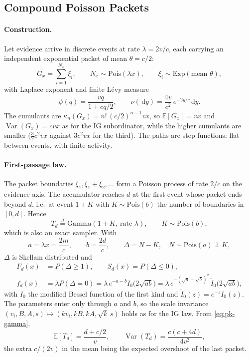\documentclass[12pt]{article}
\newcommand{\dd}{\,\mathrm{d}}
\begin{document}
\subsection{Compound Poisson Packets}
\label{sec:igs-packets}
\paragraph{Construction.}
Let evidence arrive in discrete events at rate $\lambda=2v/c$, each carrying an independent exponential packet of mean $\theta=c/2$:
\begin{equation}
  G_x=\sum_{i=1}^{N_x}\xi_i,\qquad N_x\sim\mathrm{Pois}(\lambda x),\qquad
  \xi_i\sim\mathrm{Exp}(\text{mean }\theta),
\end{equation}
with Laplace exponent and finite L\'evy measure
\begin{equation}
  \psi(q)=\frac{vq}{1+cq/2},\qquad \nu(\dd y)=\frac{4v}{c^2}\,e^{-2y/c}\dd y .
\end{equation}
The cumulants are $\kappa_n(G_x)=n!\,(c/2)^{n-1}vx$, so $\mathbb E[G_x]=vx$ and $\operatorname{Var}(G_x)=cvx$ as for the IG subordinator, while the higher cumulants are smaller ($\tfrac32c^2vx$ against $3c^2vx$ for the third). The paths are step functions: flat between events, with finite activity.

\paragraph{First-passage law.}
The packet boundaries $\xi_1,\xi_1+\xi_2,\dots$ form a Poisson process of rate $2/c$ on the evidence axis. The accumulator reaches $d$ at the first event whose packet ends beyond $d$, i.e.\ at event $1+K$ with $K\sim\mathrm{Pois}(b)$ the number of boundaries in $[0,d]$. Hence
\begin{equation}
  T_d\overset{d}{=}\mathrm{Gamma}(1+K,\ \text{rate }\lambda),\qquad
  K\sim\mathrm{Pois}(b),
  \label{eq:pk-gamma}
\end{equation}
which is also an exact sampler. With
\begin{equation}
  a=\lambda x=\frac{2m}{c},\qquad b=\frac{2d}{c},\qquad
  \Delta=N-K,\quad N\sim\mathrm{Pois}(a)\perp K,
\end{equation}
$\Delta$ is Skellam distributed and
\begin{align}
  F_d(x)&=P(\Delta\ge1),\qquad S_d(x)=P(\Delta\le0),\\
  f_d(x)&=\lambda P(\Delta=0)=\lambda\,e^{-a-b}I_0\big(2\sqrt{ab}\big)
  =\lambda\,e^{-(\sqrt a-\sqrt b)^2}\,\tilde I_0\big(2\sqrt{ab}\big),
\end{align}
with $I_0$ the modified Bessel function of the first kind and $\tilde I_0(z)=e^{-z}I_0(z)$. The parameters enter only through $a$ and $b$, so the scale invariance $(v_i,B,A,s)\mapsto(kv_i,kB,kA,\sqrt k\,s)$ holds as for the IG law. From \eqref{eq:pk-gamma},
\begin{equation}
  \mathbb E[T_d]=\frac{d+c/2}{v},\qquad
  \operatorname{Var}(T_d)=\frac{c(c+4d)}{4v^2},
\end{equation}
the extra $c/(2v)$ in the mean being the expected overshoot of the last packet.
\end{document}
